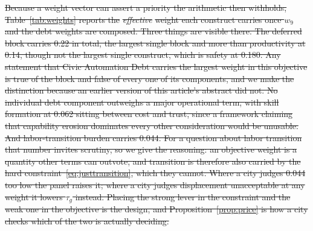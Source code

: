 \documentclass[utf8]{FrontiersinHarvard}
\providecommand{\DIFdel}[1]{{\protect\color{red}\sout{#1}}}                      %
\begin{document}
\DIFdel{Because a weight vector can assert a priority the arithmetic then withholds, Table~\ref{tab:weights} reports the }\textit{\DIFdel{effective}} %
\DIFdel{weight each construct carries once $w_9$ and the debt weights are composed. Three things are visible there. The deferred block carries 0.22 in total, the largest single block and more than productivity at 0.14, though not the largest single construct, which is safety at 0.180. Any statement that Civic Automation Debt carries the largest weight in this objective is true of the block and false of every one of its components, and we make the distinction because an earlier version of this article's abstract did not. No individual debt component outweighs a major operational term, with skill formation at 0.062 sitting between cost and trust, since a framework claiming that capability erosion dominates every other consideration would be unusable. And labor-transition burden carries 0.044. For a question about labor transition that number invites scrutiny, so we give the reasoning: an objective weight is a quantity other terms can outvote, and transition is therefore also carried by the hard constraint~\eqref{eq:justtransition}, which they cannot. Where a city judges 0.044 too low the panel raises it; where a city judges displacement unacceptable at any weight it lowers $\tau_g$ instead. Placing the strong lever in the constraint and the weak one in the objective is the design, and Proposition~\ref{prop:price} is how a city checks which of the two is actually deciding.
	}%
\end{document}
